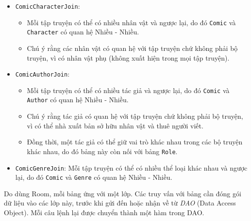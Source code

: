 \documentclass[../../../../thesis]{subfiles}
\begin{document}
\begin{itemize}
    \item
        \texttt{ComicCharacterJoin}:

        \begin{itemize}
            \item
                Mỗi tập truyện có thể có nhiều nhân vật và ngược lại, do đó
                \texttt{Comic} và \texttt{Character} có quan hệ Nhiều - Nhiều.
            \item
                Chú ý rằng các nhân vật có quan hệ với tập truyện chứ không phải
                bộ truyện, vì có nhân vật phụ (không xuất hiện trong mọi tập
                truyện).
        \end{itemize}
    \item
        \texttt{ComicAuthorJoin}:

        \begin{itemize}
            \item
                Mỗi tập truyện có thể có nhiều tác giả và ngược lại, do đó
                \texttt{Comic} và \texttt{Author} có quan hệ Nhiều - Nhiều.
            \item
                Chú ý rằng tác giả có quan hệ với tập truyện chứ không phải bộ
                truyện, vì có thể nhà xuất bản sở hữu nhân vật và thuê người
                viết.
            \item
                Đồng thời, một tác giả có thể giữ vai trò khác nhau trong các bộ
                truyện khác nhau, do đó bảng này còn nối với bảng \texttt{Role}.
        \end{itemize}
\end{itemize}

\begin{itemize}[resume, before = \vspace*{-\dimexpr\topsep+\partopsep\relax}]
    \item
        \texttt{ComicGenreJoin}: Mỗi tập truyện có thể có nhiều thể loại khác
        nhau và ngược lại, do đó \texttt{Comic} và \texttt{Genre} có quan hệ
        Nhiều - Nhiều.
\end{itemize}

Do dùng Room, mỗi bảng ứng với một lớp. Các truy vấn với bảng cần đóng gói dữ
liệu vào các lớp này, trước khi gửi đến hoặc nhận về từ \emph{DAO} (Data Access
Object). Mỗi câu lệnh lại được chuyển thành một hàm trong DAO.
\end{document}
